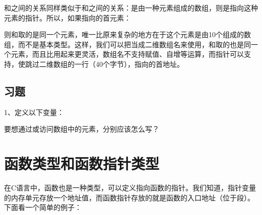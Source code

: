 和之间的关系同样类似于和之间的关系：是由一种元素组成的数组，则是指向这种元素的指针。所以，如果指向的首元素：




则和取的是同一个元素，唯一比原来复杂的地方在于这个元素是由10个组成的数组，而不是基本类型。这样，我们可以把当成二维数组名来使用，和取的也是同一个元素，而且比用起来更灵活，数组名不支持赋值、自增等运算，而指针可以支持，使跳过二维数组的一行（40个字节），指向的首地址。


\subsection*{习题}
%


1、定义以下变量：




要想通过或访问数组中的元素，分别应该怎么写？




\section{函数类型和函数指针类型}
%
在C语言中，函数也是一种类型，可以定义指向函数的指针。我们知道，指针变量的内存单元存放一个地址值，而函数指针存放的就是函数的入口地址（位于段）。下面看一个简单的例子：


